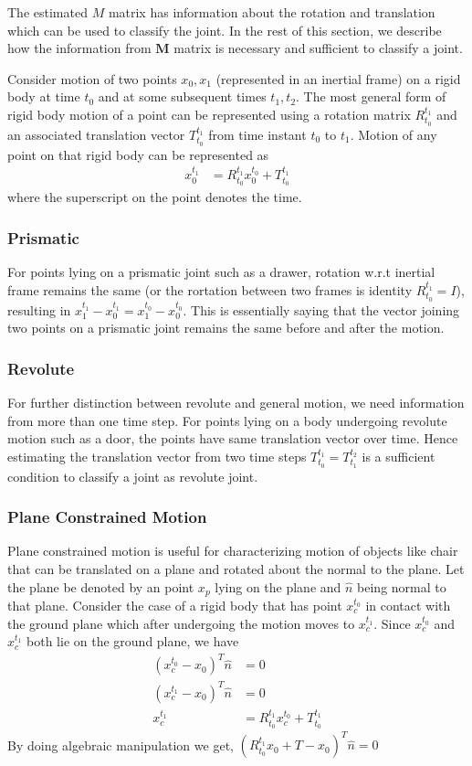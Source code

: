 \documentclass[conference]{IEEEtran}
\begin{document}
The estimated $M$ matrix has information about the rotation and translation which can be used to classify the joint. In the rest of this section, we describe how the information from $\mathbf{M}$ matrix is necessary and sufficient to classify a joint.

Consider motion of two points $x_0,x_1$ (represented in an inertial frame) on a rigid body at time $t_0$ and at some subsequent times $t_1,t_2$. The most general form of rigid body motion of a point can be represented using a rotation matrix $R_{t_0}^{t_1}$ and an associated translation vector $T_{t_0}^{t_1}$ from time instant $t_0$ to $t_1$. Motion of any point on that rigid body can be represented as
\begin{align}
x_0^{t_1}& = R_{t_0}^{t_1}x_0^{t_0}+T_{t_0}^{t_1}
\end{align}
where the superscript on the point denotes the time.
\subsubsection{Prismatic}
For points lying on a prismatic joint such as a drawer, rotation w.r.t inertial frame remains the same (or the rortation between two frames is identity $R_{t_0}^{t_1}=I$), resulting in $x_1^{t_1}-x_0^{t_1} = x_1^{t_0}-x_0^{t_0}$. This is essentially saying that the vector joining two points on a prismatic joint remains the same before and after the motion.
\subsubsection{Revolute}
For further distinction between revolute and general motion, we need information from more than one time step. For points lying on a body undergoing revolute motion such as a door, the points have same translation vector over time. Hence estimating the translation vector from two time steps $T_{t_0}^{t_1} = T_{t_1}^{t_2}$ is a sufficient condition to classify a joint as revolute joint. 
\subsubsection{Plane Constrained Motion} Plane constrained motion is useful for characterizing motion of objects like chair that can be translated on a plane and rotated about the normal to the plane. Let the plane be denoted by an point $x_p$ lying on the plane and $\hat{n}$ being normal to that plane. Consider the case of a rigid body that has point $x_c^{t_0}$ in contact with the ground plane which after undergoing the motion moves to $x_c^{t_1}$. Since $x_c^{t_0}$ and $x_c^{t_1}$ both lie on the ground plane, we have
\begin{align}
(x_c^{t_0}-x_0)^T\hat{n}&=0\\
(x_c^{t_1}-x_0)^T\hat{n}&=0\\
x_c^{t_1} &= R_{t_0}^{t_1}x_c^{t_0}+T_{t_0}^{t_1}
\end{align}
By doing algebraic manipulation we get, $(R_{t_0}^{t_1}x_0+T-x_0)^T\hat{n}=0$
\end{document}
